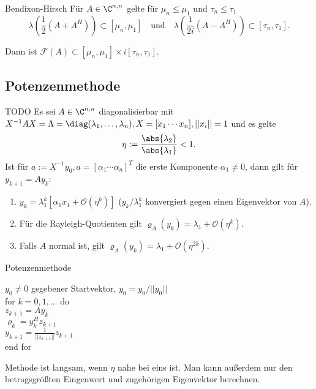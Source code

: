 \begin{karte}{Bendixon-Hirsch}
    Für \( A\in \C^{n,n} \) gelte für \( \mu_n \leq \mu_1 \) und 
    \( \tau_n \leq \tau_1 \) 
    \[ \lambda \left( \frac{1}{2} (A + A^H) \right) \subset [\mu_n, \mu_1] \quad \text{und} 
    \quad \lambda \left( \frac{1}{2i} (A - A^H) \right) \subset [\tau_n, \tau_1]. \]

    Dann ist \( \mathcal{F}(A) \subset [\mu_n, \mu_1] \times i[\tau_n, \tau_1] \).
\end{karte}

\subsection{Potenzenmethode}

\begin{karte}{TODO}
    Es sei \( A\in \C^{n,n} \) diagonalisierbar mit \( X^{-1} A X = \Lambda = \diag(\lambda_1, \ldots, \lambda_n), 
    X = [x_1 \cdots x_n], ||x_i|| = 1 \) und es gelte 
    \[ \eta := \frac{\abs{\lambda_2}}{\abs{\lambda_1}} < 1. \]
    Ist für \( a := X^{-1}y_0, a = [\alpha_1 \cdots \alpha_n]^T \) die erste Komponente \( \alpha_1 \neq 0 \), 
    dann gilt für \( y_{k+1} = A y_k \):
    \begin{enumerate}
        \item \( y_k = \lambda_1^k [\alpha_1 x_1 + \mathcal{O}(\eta^k)] \) (\(y_k/\lambda_1^k\) konvergiert 
        gegen einen Eigenvektor von \(A\)).
        \item Für die Rayleigh-Quotienten gilt \( \varrho_A(y_k) = \lambda_1 + \mathcal{O}(\eta^k) \).
        \item Falls \(A\) normal ist, gilt \( \varrho_A(y_k) = \lambda_1 + \mathcal{O}(\eta^{2k}) \).
    \end{enumerate}
\end{karte}

\begin{karte}{Potenzenmethode}
    \begin{tabbing}
        \(y_0 \neq 0\) gegebener Startvektor, \(y_0 = y_0 / ||y_0||\) \\
        for \= \( k = 0,1,\ldots \) do \\
        \> \( z_{k+1} = A y_k \) \\
        \> \( \varrho_k = y_k^H z_{k+1} \) \\
        \> \( y_{k+1} = \frac{1}{||z_{k+1}||} z_{k+1}\) \\
        end for
    \end{tabbing}
    Methode ist langsam, wenn \( \eta \) nahe bei eins ist. 
    Man kann außerdem nur den betragsgrößten Eingenwert und zugehörigen 
    Eigenvektor berechnen. 
\end{karte}

